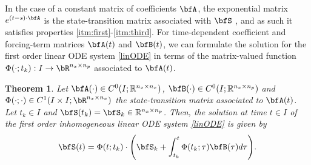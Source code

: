 \documentclass[DIV=12]{scrartcl} %
\newtheorem{theorem}{Theorem}
\theoremstyle{definition}
\newtheorem{remark}{Remark}
\begin{document}
In the case of a constant matrix of coefficients $\bfA$, the exponential matrix $e^{(t-s)\cdot \bfA}$ is the state-transition matrix associated with $\bfS$ \cite[Chap.~1, Sect.~5]{BrockettRogerW.2015Fdls}, and as such it satisfies properties \ref{itm:first}-\ref{itm:third}. 
For time-dependent coefficient and forcing-term matrices $\bfA (t)$ and $\bfB (t)$, we can formulate the solution for the first order linear ODE system \eqref{linODE} in terms of the matrix-valued function $\Phi(\cdot;t_k): I \to \bR ^{n_x \times n_p}$ associated to $\bfA(t)$.
\begin{theorem}
\label{thm:generalODESol}
     Let $\bfA(\cdot)\in C^0(I;\mathbb{R}^{n_x\times n_x})$, $\bfB(\cdot)\in C^0(I;\mathbb{R}^{n_x\times n_p})$ and $\Phi(\cdot;\cdot)\in C^1(I\times I;\bR^{n_x\times n_x})$ the state-transition matrix associated to $\bfA(t)$. Let $t_k\in I$ and $\bfS(t_k)=\bfS_k\in\mathbb{R}^{n_x\times n_p}$. Then, the solution at time $t\in I$ of the first order inhomogeneous linear ODE system \eqref{linODE} is given by
    \begin{equation}
    \label{solutionODE}
     \bfS(t) = \Phi(t;t_{k})\cdot\Biggl(\bfS_{k} + \int_{t_{k}}^{t}\Phi(t_k;\tau)\bfB(\tau)d\tau\Biggr).
\end{equation}
\end{theorem}
\end{document}

